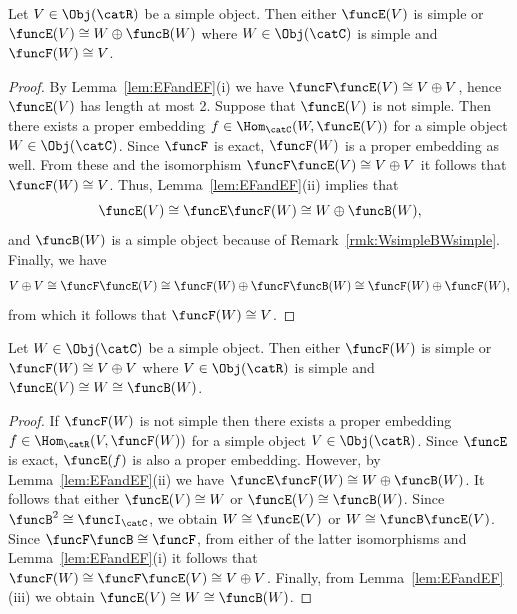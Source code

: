 \documentclass[12pt]{amsart}
\begin{document}
\begin{lem}
\label{lem:E2}
Let $V\in\Obj(\catR)$ be a simple object. Then either $\funcE (V)$ is simple or $\funcE (V)\cong W\oplus \funcB(W)$ where $W\in\Obj(\catC)$ is simple and  $\funcF(W)\cong V$.  
\end{lem}

\begin{proof}
By Lemma~\ref{lem:EFandEF}(i) we have $\funcF\funcE(V)\cong V\oplus V$, hence $\funcE(V)$ has length at most 2. 
Suppose that $\funcE (V)$ is not simple.
Then there exists a proper embedding  $f\in\Hom_{\catC}(W, \funcE (V))$ for a simple object $W\in\Obj(\catC)$.  Since $\funcF$ is exact,  $\funcF(W)$ is a proper embedding  as well. From these and the isomorphism $\funcF\funcE(V)\cong V\oplus V$ it follows that  $\funcF (W)\cong V$. Thus, Lemma~\ref{lem:EFandEF}(ii) implies that 
\[
\funcE(V)\cong\funcE\funcF(W)\cong
W\oplus \funcB (W),
\] 
and $\funcB(W)$ is a simple object because of Remark~\ref{rmk:WsimpleBWsimple}.
Finally, we have
\[
V\oplus V\cong \funcF\funcE(V)\cong \funcF(W)\oplus \funcF\funcB(W)
\cong \funcF(W)\oplus \funcF(W),
\]
from which it follows that $\funcF(W)\cong V$. 
 \end{proof}

\begin{lem}
\label{lem:F2}
Let $W\in\Obj(\catC)$ be a simple object. Then either $\funcF (W)$ is simple or $\funcF (W)\cong V\oplus V$ where $V\in\Obj(\catR)$ is simple
and  $\funcE(V)\cong W\cong \funcB(W)$.  
\end{lem}
\begin{proof}
If $\funcF(W)$ is not simple then there exists a proper embedding $f\in\Hom_{\catR}(V,\funcF(W))$ for a simple object  $V\in\Obj(\catR)$.
 Since $\funcE$ is exact, $\funcE(f)$ is also a proper embedding. However, by Lemma~\ref{lem:EFandEF}(ii) we have $\funcE\funcF(W)\cong W\oplus \funcB(W)$. It follows that either $\funcE(V)\cong W$ or $\funcE(V)\cong \funcB(W)$. Since $\funcB^2\cong \funcI_\catC$, we obtain $W\cong \funcE(V)$ or $W\cong \funcB\funcE(V)$. Since $\funcF\funcB\cong\funcF$, from either of the latter isomorphisms and Lemma~\ref{lem:EFandEF}(i)
it follows that 
$
\funcF(W)\cong \funcF\funcE(V)\cong V\oplus V
$. Finally, from Lemma~\ref{lem:EFandEF}(iii) we obtain 
$\funcE(V)\cong W\cong \funcB(W)$.
\end{proof}
\end{document}
